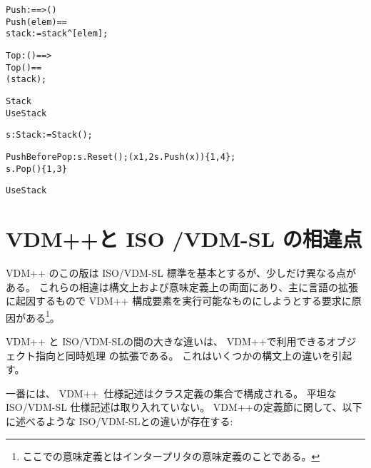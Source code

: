 \documentclass[\pformat,12pt]{jarticle}
\newcommand{\vdmslpp}[2]{%
#2
}
\newcommand{\vdmsl}{VDM-SL}
\newcommand{\vdmpp}{VDM++}
\begin{document}
\begin{description}
\begin{alltt}
     Push:  ==> ()
    Push(elem) ==
      stack := stack ^ [elem];

     Top : () ==> 
    Top() ==
       ( stack);

 Stack
 UseStack


  s : Stack :=  Stack();


  PushBeforePop : s.Reset(); ( x  {1,2}  s.Push(x))\{1,4\}; 
                  s.Pop()\{1,3\}
 
 UseStack
\end{alltt}
\end{description}

\section{VDM++と ISO /VDM-SL の相違点}\label{diff}

  \vdmslpp{\vdmsl}{\vdmpp} のこの版は ISO/VDM-SL 標準を基本とするが、少しだけ異なる点がある。
これらの相違は構文上および意味定義上の両面にあり、主に言語の拡張に起因するもので\vdmslpp{\vdmsl}{\vdmpp}構成要素を実行可能なものにしようとする要求に原因がある\footnote{ここでの意味定義とはインタープリタの意味定義のことである。}。


{\vdmpp} と ISO/VDM-SLの間の大きな違いは、 \vdmpp で利用できるオブジェクト指向と同時処理 %
の拡張である。
これはいくつかの構文上の違いを引起す。

一番には、  \vdmpp\ 仕様記述はクラス定義の集合で構成される。
平坦な ISO/VDM-SL 仕様記述は取り入れていない。
\vdmpp の定義節に関して、以下に述べるような ISO/VDM-SLとの違いが存在する:
\end{document}
